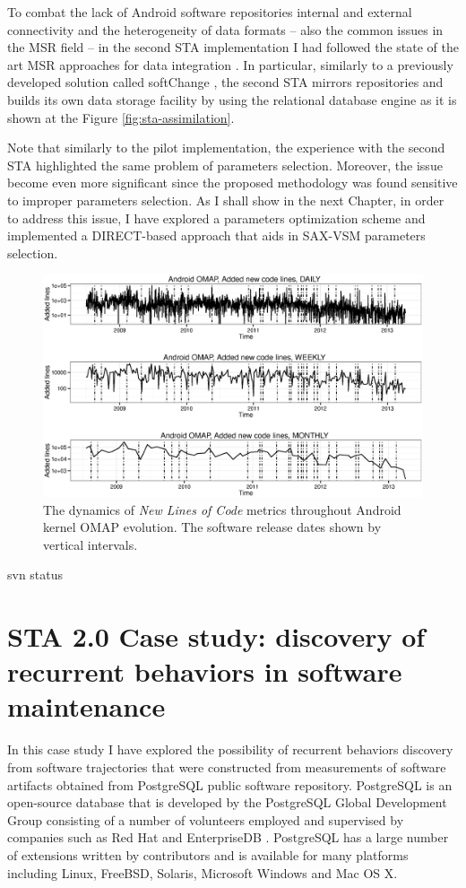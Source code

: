 To combat the lack of Android software repositories internal and external connectivity and the heterogeneity 
of data formats -- also the common issues in the MSR field -- in the second STA implementation I had followed the state of 
the art MSR approaches for data integration \cite{citeulike:13058334} \cite{cvsanaly}. 
In particular, similarly to a previously developed solution called softChange \cite{german04_softchange}, the second STA mirrors 
repositories and builds its own data storage facility by using the relational database engine as it is shown at 
the Figure \ref{fig:sta-assimilation}.

Note that similarly to the pilot implementation, the experience with the second STA highlighted the same problem of 
parameters selection. Moreover, the issue become even more significant since the proposed methodology was found sensitive to 
improper parameters selection. As I shall show in the next Chapter, in order to address this issue, I have explored a parameters 
optimization scheme and implemented a DIRECT-based approach \cite{citeulike:12563460} that aids in SAX-VSM 
parameters selection.

\begin{figure}[t]
   \centering
   \includegraphics[width=145mm]{figures/omap_added_lines_plot.eps}
   \caption{The dynamics of \textit{New Lines of Code} metrics throughout Android kernel OMAP evolution. 
   The software release dates shown by vertical intervals.}
   \label{fig:OMAP_dynamics}
\end{figure}svn status


\section{STA 2.0 Case study: discovery of recurrent behaviors in software maintenance}
In this case study I have explored the possibility of recurrent behaviors discovery from software trajectories that 
were constructed from measurements of software artifacts obtained from PostgreSQL public software repository.
PostgreSQL is an open-source database that is developed by the PostgreSQL Global Development Group consisting of 
a number of volunteers employed and supervised by companies such as Red Hat and EnterpriseDB \cite{postgre-contrib}.
PostgreSQL has a large number of extensions written by contributors and is available for many platforms including 
Linux, FreeBSD, Solaris, Microsoft Windows and Mac OS X.

